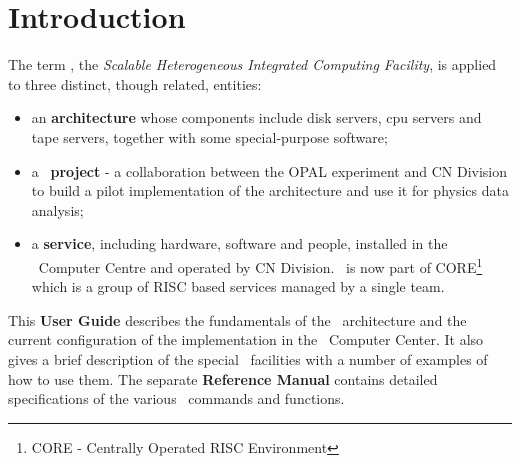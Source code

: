 \parskip12pt%
\setlength{\parindent}{0in}
 
\newbox{\localb}
\newcommand{\Lentrylabel}[1]{\savebox{\localb}{\bf#1:}%
   \ifdim \wd\localb >\labelwidth\relax
       \parbox[b]{\labelwidth}{\makebox[0pt][l]{\usebox{\localb}}\\\null}%
   \else
       \usebox{\localb}%
   \fi
  \hfil\relax}
\newenvironment{Lentry}%
   {%
    \begin{list}{}{\let\makelabel\Lentrylabel
      \setlength{\labelwidth}{2cm}%
 dimension
      \setlength{\leftmargin}{\labelwidth}
      \addtolength{\leftmargin}{\labelsep}}}
   {\end{list}}
 
 
\renewcommand{\Huge}{\huge}
 
 
\small
\tableofcontents
\normalsize
 
 
\chapter{Introduction}
 
The term \shift, the {\it Scalable Heterogeneous
Integrated Computing Facility}, is applied to three distinct, though related,
entities:
\begin{itemize}
\item an {\bf architecture} whose components include disk servers, cpu servers
 and tape servers,
together with some special-purpose software;
\item a \CERN\ {\bf project} - a collaboration between the OPAL experiment
and CN Division to build a pilot implementation of the architecture and use it
 for
physics data analysis;
\item a {\bf service}, including hardware, software and people, installed in the
\CERN\ Computer Centre and operated by CN Division.
\shift\ is now part of CORE\footnote{CORE - Centrally Operated RISC Environment}
which is a group of RISC based services managed by a single team.
\end{itemize}
 
This {\bf User Guide} describes the fundamentals
of the \shift\ architecture and the current configuration of the implementation
 in the
\CERN\ Computer Center. It also gives a brief description of the special \shift\
 facilities
with a number of examples of how to use them.
The separate {\bf Reference Manual} contains detailed specifications of the
various \shift\ commands and functions.
 
